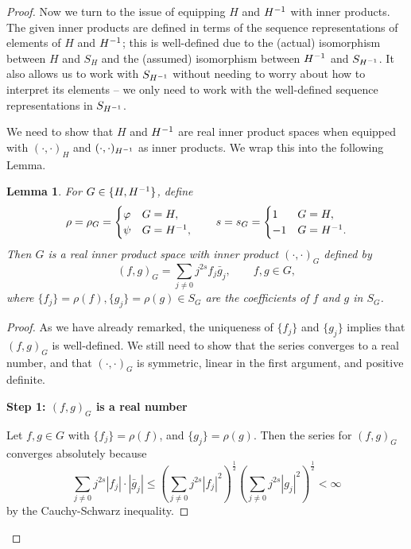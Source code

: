 \documentclass{homework}
\newtheorem{lemma}{Lemma}
\begin{document}
\begin{arabicparts}
\begin{proof}
		Now we turn to the issue of equipping $H$ and ${H^{-1}}$ with inner products. The given inner products are defined in terms of the sequence representations of elements of $H$ and ${H^{-1}}$; this is well-defined due to the (actual) isomorphism between $H$ and $S_H$ and the (assumed) isomorphism between ${H^{-1}}$ and $S_{H^{-1}}$. It also allows us to work with $S_{H^{-1}}$ without needing to worry about how to interpret its elements -- we only need to work with the well-defined sequence representations in $S_{H^{-1}}$.
		
		We need to show that $H$ and ${H^{-1}}$ are real inner product spaces when equipped with $(\cdot,\cdot)_H$ and $(\cdot,\cdot)_{H^{-1}}$ as inner products. We wrap this into the following Lemma.
		\begin{lemma}
			For $G \in \{H, {H^{-1}}\}$, define 
			\begin{equation}
				\rho = \rho_G = \begin{cases}
					\varphi & G = H, \\
					\psi & G = {H^{-1}},
				\end{cases}\qquad
				s = s_G = \begin{cases}
					1 & G = H, \\
					-1 & G = {H^{-1}}.
				\end{cases}
			\end{equation}
			Then $G$ is a real inner product space with inner product $(\cdot,\cdot)_G$ defined by
			\begin{equation}
				(f,g)_G = \sum_{j\ne0}j^{2s}f_j\bar{g}_j, \qquad f,g \in G,
			\end{equation}
			where $\{f_j\} = \rho(f), \{g_j\}=\rho(g) \in S_G$ are the coefficients of $f$ and $g$ in $S_G$.
		\end{lemma}
		\begin{proof}
			As we have already remarked, the uniqueness of $\{f_j\}$ and $\{g_j\}$ implies that $(f,g)_G$ is well-defined. We still need to show that the series converges to a real number, and that $(\cdot,\cdot)_G$ is symmetric, linear in the first argument, and positive definite.
			
			\textbf{Step 1: $(f,g)_G$ is a real number}
			
			Let $f,g \in G$ with $\{f_j\} = \rho(f)$, and $\{g_j\} = \rho(g)$. Then the series for $(f,g)_G$ converges absolutely because
			\begin{equation}
				\sum_{j\ne 0}j^{2s}|f_j|\cdot|\bar{g}_j| \le \left(\sum_{j\ne0}j^{2s}|f_j|^2\right)^\frac{1}{2}\left(\sum_{j\ne0}j^{2s}|g_j|^2\right)^\frac{1}{2} < \infty
			\end{equation}
			by the Cauchy-Schwarz inequality.
			

\end{proof}
\end{proof}
\end{arabicparts}
\end{document}
